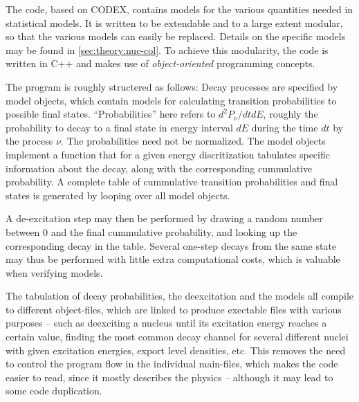 The \codename{} code, based on CODEX\cite{gollerthan:1988:thesis}, contains models for the various quantities needed in statistical models. It is written to be extendable and to a large extent modular, so that the various models can easily be replaced. Details on the specific models may be found in \autoref{sec:theory:nuc-col}.
To achieve this modularity, the code is written in C++ and makes use of \emph{object-oriented} programming concepts. 

The program is roughly structered as follows:
 Decay processes are specified by model objects, which contain models for calculating transition probabilities to possible final states. ``Probabilities'' here refers to $d^2 P_\nu/dtdE$, roughly the probability to decay to a final state in energy interval $dE$ during the time $dt$ by the process $\nu$. The probabilities need not be normalized.
The model objects implement a function that for a given energy discritization tabulates specific information about the decay, along with the corresponding cummulative probability. A complete table of cummulative transition probabilities and final states is generated by looping over all model objects.

 A de-excitation step may then be performed by drawing a random number between $0$ and the final cummulative probability, and looking up the corresponding decay in the table. Several one-step decays from the same state may thus be performed with little extra computational costs, which is valuable when verifying models.

The tabulation of decay probabilities, the deexcitation and the models all compile to different object-files, which are linked to produce exectable files with various purposes -- such as deexciting a nucleus until its excitation energy reaches a certain value, finding the most common decay channel for several different nuclei with given excitation energies, export level densities, etc. 
This removes the need to control the program flow in the individual main-files, which makes the code easier to read, since it mostly describes the physics -- although it may lead to some code duplication.

